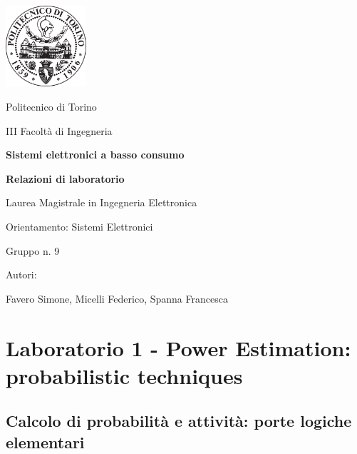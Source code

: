 \documentclass[11pt,  english, makeidx, a4paper, titlepage, oneside]{book}
\begin{document}
\begin{titlepage}

	\centerline{\includegraphics[width=3cm]{./img/general/polito.png}}
	\vspace{0.3cm}
	\centerline{\Large{Politecnico di Torino}}
	\vspace{0.3cm}
	\centerline{\Large{III Facoltà di Ingegneria}}
	\vspace{3cm}
	\centerline{\Huge\textbf{Sistemi elettronici a basso consumo}}
	\vspace{1cm}
	\centerline{\LARGE\textbf{Relazioni di laboratorio}}
	\vspace{3cm}
	\centerline{\LARGE{Laurea Magistrale in Ingegneria Elettronica}}
	\vspace{0.3cm}
	\centerline{\LARGE{Orientamento: Sistemi Elettronici}}
	\vspace{3cm}
	\centerline{\Large{Gruppo n. 9}}
	\vspace{2cm}
	\centerline{\Large{Autori:}}
	\vspace{0.3cm}
	\centerline{\Large{Favero Simone, Micelli Federico, Spanna Francesca}}
	
\end{titlepage}

\tableofcontents %
\pagebreak %

\chapter{Laboratorio 1 - Power Estimation: probabilistic techniques}

\section{Calcolo di probabilità e attività: porte logiche elementari}
\end{document}

